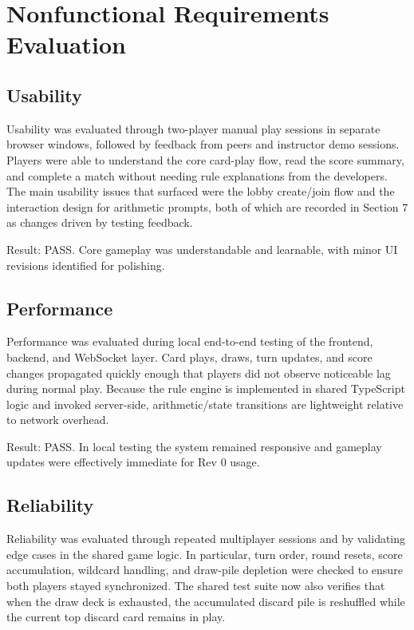 \documentclass[12pt, titlepage]{article}
\begin{document}
    \section{Nonfunctional Requirements Evaluation}

    \subsection{Usability}

    Usability was evaluated through two-player manual play sessions in separate
    browser windows, followed by feedback from peers and instructor demo sessions.
    Players were able to understand the core card-play flow, read the score summary,
    and complete a match without needing rule explanations from the developers.
    The main usability issues that surfaced were the lobby create/join flow and the
    interaction design for arithmetic prompts, both of which are recorded in
    Section 7 as changes driven by testing feedback.

    Result: PASS. Core gameplay was understandable and learnable, with minor UI
    revisions identified for polishing.

    \subsection{Performance}

    Performance was evaluated during local end-to-end testing of the frontend,
    backend, and WebSocket layer. Card plays, draws, turn updates, and score
    changes propagated quickly enough that players did not observe noticeable lag
    during normal play. Because the rule engine is implemented in shared TypeScript
    logic and invoked server-side, arithmetic/state transitions are lightweight
    relative to network overhead.

    Result: PASS. In local testing the system remained responsive and gameplay
    updates were effectively immediate for Rev 0 usage.

    \subsection{Reliability}

    Reliability was evaluated through repeated multiplayer sessions and by
    validating edge cases in the shared game logic. In particular, turn order,
    round resets, score accumulation, wildcard handling, and draw-pile depletion
    were checked to ensure both players stayed synchronized. The shared test suite
    now also verifies that when the draw deck is exhausted, the accumulated discard
    pile is reshuffled while the current top discard card remains in play.
\end{document}
